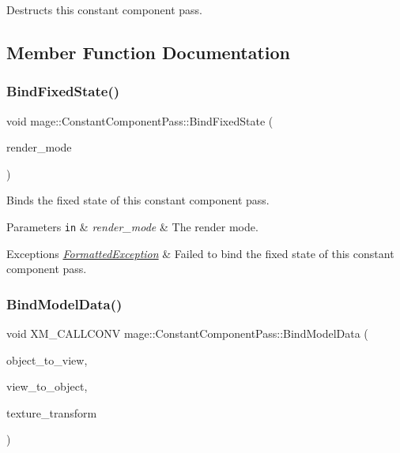 Destructs this constant component pass. 

\subsection{Member Function Documentation}
\hypertarget{classmage_1_1_constant_component_pass_a87e9d62d5d93b1a66388ab0ccd494e8b}{}\label{classmage_1_1_constant_component_pass_a87e9d62d5d93b1a66388ab0ccd494e8b} 
\subsubsection{\texorpdfstring{Bind\+Fixed\+State()}{BindFixedState()}}
{\footnotesize\ttfamily void mage\+::\+Constant\+Component\+Pass\+::\+Bind\+Fixed\+State (\begin{DoxyParamCaption}\item[{\hyperlink{namespacemage_a5e7e18b0154373ce8fc942fe3f6b27fd}{Render\+Mode}}]{render\+\_\+mode }\end{DoxyParamCaption})}

Binds the fixed state of this constant component pass.


\begin{DoxyParams}[1]{Parameters}
\mbox{\tt in}  & {\em render\+\_\+mode} & The render mode. \\
\hline
\end{DoxyParams}

\begin{DoxyExceptions}{Exceptions}
{\em \hyperlink{classmage_1_1_formatted_exception}{Formatted\+Exception}} & Failed to bind the fixed state of this constant component pass. \\
\hline
\end{DoxyExceptions}
\hypertarget{classmage_1_1_constant_component_pass_a196372d184f74c8f268adc1e7865ef17}{}\label{classmage_1_1_constant_component_pass_a196372d184f74c8f268adc1e7865ef17} 
\subsubsection{\texorpdfstring{Bind\+Model\+Data()}{BindModelData()}}
{\footnotesize\ttfamily void X\+M\+\_\+\+C\+A\+L\+L\+C\+O\+NV mage\+::\+Constant\+Component\+Pass\+::\+Bind\+Model\+Data (\begin{DoxyParamCaption}\item[{F\+X\+M\+M\+A\+T\+R\+IX}]{object\+\_\+to\+\_\+view,  }\item[{C\+X\+M\+M\+A\+T\+R\+IX}]{view\+\_\+to\+\_\+object,  }\item[{C\+X\+M\+M\+A\+T\+R\+IX}]{texture\+\_\+transform }\end{DoxyParamCaption})\hspace{0.3cm}{\ttfamily [private]}}

